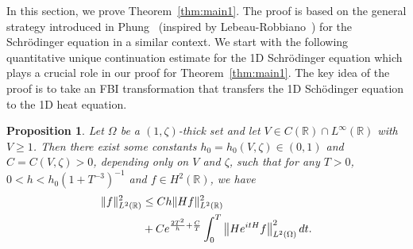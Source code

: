 \documentclass[a4paper,reqno]{amsart}
\newtheorem{proposition}[theorem]{Proposition}
\theoremstyle{definition}
\numberwithin{equation}{section}
\newcommand{\R}{\mathbb{R}}
\def \R {{\mathbb{R} }}
\def \d {{\rm{d}}}
\begin{document}
In this section, we prove Theorem~\ref{thm:main1}. The proof is based on the general strategy introduced in Phung~\cite{Phung01} (inspired by Lebeau-Robbiano~\cite{LeRo}) for the Schr\"odinger equation in a similar context. We start with the following quantitative unique continuation estimate for the 1D Schr\"odinger equation which plays a crucial role in our proof for Theorem~\ref{thm:main1}. The key idea of the proof is to take an FBI transformation that transfers the 1D Sch\"odinger equation to the 1D heat equation.
\begin{proposition}\label{prop:key}
    Let $\Omega$ be a $(1,\zeta)$-thick set and let $V\in C(\R)\cap L^{\infty}(\R)$ with $V\ge 1$. Then there exist some constants $h_{0}=h_{0}(V,\zeta)\in (0,1)$ and $C=C(V,\zeta)>0$, depending only on $V$ and $\zeta$, such that for any $T>0$, $0<h<h_{0}\left(1+T^{-3}\right)^{-1}$ and $f\in H^{2}(\R)$, we have 
    \begin{equation}\label{est:Key}
    \begin{aligned}
       \|f\|_{L^{2}(\R)}^{2}
       &\le Ch\|Hf\|_{L^{2}(\R)}^{2}\\      
       &+Ce^{\frac{2T^{2}}{h}+\frac{C}{T}}\int_{0}^{T}\left\|He^{itH}f\right\|_{L^{2}(\Omega)}^2\d t.
       \end{aligned}
    \end{equation}
\end{proposition}
\end{document}
